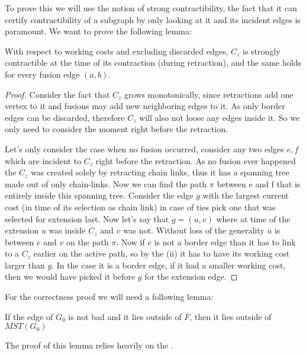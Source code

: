 To prove this we will use the notion of strong contractibility, the fact that it can certify contractibility of a subgraph by only looking at it and its incident edges is paramount. We want to prove the following lemma:

\begin{lemma}
\label{sc}
With respect to working costs and excluding discarded edges, $C_z$ is strongly contractible at the time of its contraction (during retraction), and the same holds for every fusion edge $(a, b)$.
\end{lemma}

\begin{proof}    
Consider the fact that $C_z$ grows monotonically, since  retractions add one vertex to it and fusions may add new neighboring edges to it. As only border edges can be discarded, therefore $C_z$ will also not loose any edges inside it. So we only need to consider the moment right before the retraction.

Let's only consider the case when no fusion occurred, consider any two edges $e, f$ which are incident to $C_z$ right before the retraction. As no fusion ever happened the $C_z$ was created solely by retracting chain links, thus it has a spanning tree made out of only chain-links.  Now we can find the path $\pi$ between e and f that is entirely inside this spanning tree. Consider the edge $g$ with the largest current cost (in time of its selection as chain link) in case of ties pick one that was selected for extension last. Now let's say that $g = (u,v)$ where at time of the extension $u$ was inside $C_z$ and $v$ was not. Without loss of the generality $u$ is between $e$ and $v$ on the path $\pi$. Now if $e$ is not a border edge than it has to link to a $C_z$ earlier on the active path, so by the (ii) it has to have its working cost larger than $g$. In the case it is a border edge, if it had a smaller working cost, then we would have picked it before $g$ for the extension edge.
\end{proof}

For the correctness proof we will need a following lemma:
\begin{lemma}
\label{bad}
If the edge of $G_{0}$ is not bad and it lies outside of $F$, then it lies outside of $MST(G_0)$
\end{lemma}
The proof of this lemma relies heavily on the .

